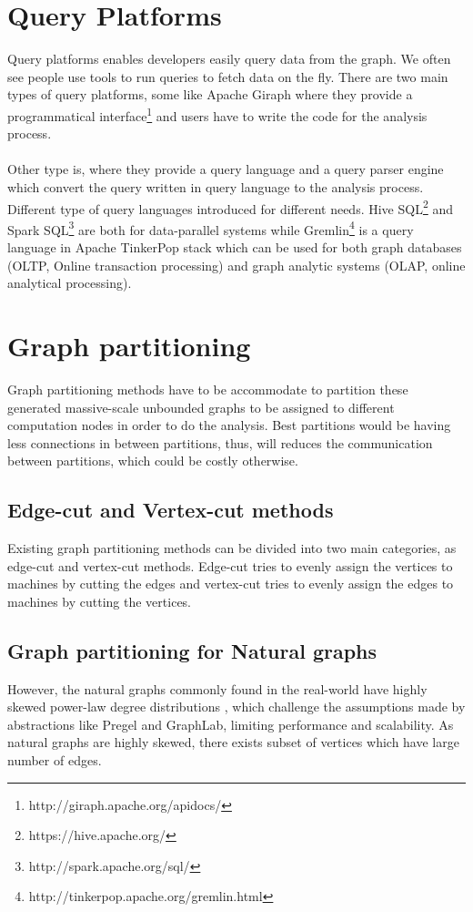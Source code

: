 \documentclass[12pt]{report}
\numberwithin{figure}{section}
\numberwithin{table}{section}
\begin{document}
\section{Query Platforms}
Query platforms enables developers easily query data from the graph. We often see people use tools to run queries to fetch data on the fly. There are two main types of query platforms, some like Apache Giraph where they provide a programmatical interface\footnote{http://giraph.apache.org/apidocs/} and users have to write the code for the analysis process. 

\paragraph{}

Other type is, where they provide a query language and a query parser engine which convert the query written in query language to the analysis process. Different type of query languages introduced for different needs. Hive SQL\footnote{https://hive.apache.org/} and Spark SQL\footnote{http://spark.apache.org/sql/} are both for data-parallel systems while Gremlin\footnote{http://tinkerpop.apache.org/gremlin.html} is a query language in Apache TinkerPop stack which can be used for both graph databases (OLTP, Online transaction processing) and graph analytic systems (OLAP, online analytical processing).

\section{Graph partitioning}
Graph partitioning methods have to be accommodate to partition these generated massive-scale unbounded graphs to be assigned to  different computation nodes in order to do the analysis. Best partitions would be having less connections in between partitions, thus, will reduces the communication between partitions, which could be costly otherwise.

\subsection{Edge-cut and Vertex-cut methods}
Existing graph partitioning methods can be divided into two main categories, as edge-cut and vertex-cut methods\cite{S-PowerGraph}. Edge-cut tries to evenly assign the vertices to machines by cutting the edges and vertex-cut tries to evenly assign the edges to machines by cutting the vertices.
 
\subsection{Graph partitioning for Natural graphs}
However, the natural graphs commonly found in the real-world have highly skewed power-law degree distributions \cite{powerLaw1} \cite{powerLaw2}, which challenge the assumptions made by abstractions like  Pregel\cite{Pregel} and GraphLab\cite{Graphlab}, limiting performance and scalability. As natural graphs are highly skewed, there exists subset of vertices which have large number of edges. 
\end{document}
